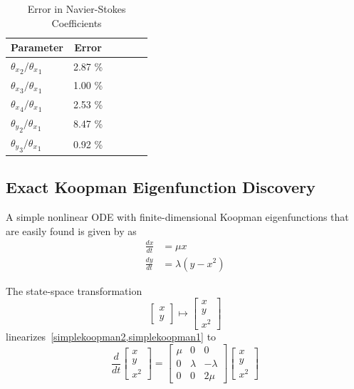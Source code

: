 \documentclass{article}
\begin{document}
\begin{table}[t]
\caption{Error in Navier-Stokes Coefficients}
\label{tab:ns_data}
\vskip 0.15in
\begin{center}
\begin{small}
\begin{sc}
\begin{tabular}{lccccr}
\toprule
Parameter & Error \\
\midrule
${\theta_x}_2 / {\theta_x}_1 $ & 2.87 \% \\
${\theta_x}_3 / {\theta_x}_1 $ & 1.00 \% \\
${\theta_x}_4 / {\theta_x}_1 $ & 2.53 \% \\
${\theta_y}_2 / {\theta_x}_1 $ & 8.47 \% \\
${\theta_y}_3 / {\theta_x}_1 $ & 0.92 \% \\
\bottomrule
\end{tabular}
\end{sc}
\end{small}
\end{center}
\vskip -0.1in
\end{table}

\subsection{Exact Koopman Eigenfunction Discovery}
\label{exactdiscovery}
A simple nonlinear ODE with finite-dimensional Koopman eigenfunctions that are easily found is given by \citet{kutz2016dynamic} as
\begin{align}
 \label{simplekoopman1}
 \frac{dx}{dt} &= \mu x \\
 \label{simplekoopman2}
 \frac{dy}{dt} &= \lambda(y - x^2)
 \end{align}
 
The state-space transformation
\begin{equation}
    \label{eqn:exacttransform}
\begin{bmatrix}
x\\
y
\end{bmatrix} \mapsto \begin{bmatrix}
x \\
y \\
x^2
\end{bmatrix}
\end{equation}
linearizes~\cref{simplekoopman2,simplekoopman1} to
\begin{equation}
    \label{eqn:koopmanop}
\frac{d}{dt} \begin{bmatrix}
x \\
y \\
x^2
\end{bmatrix} = \begin{bmatrix}
\mu & 0 & 0 \\
0 & \lambda & -\lambda \\
0 & 0 & 2 \mu
\end{bmatrix} \begin{bmatrix}
x \\
y \\
x^2
\end{bmatrix}
\end{equation}
\end{document}
